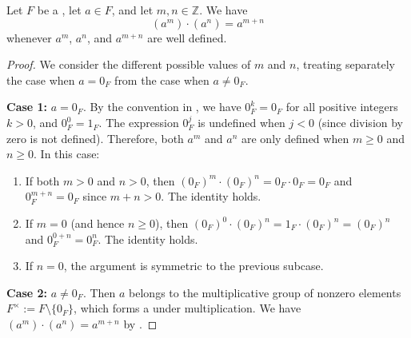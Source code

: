 \begin{lemma} \label{lemma:product_of_powers_of_the_same_base_in_a_field_is_additive_in_exponents}
    Let $F$ be a , let $a \in F$, and let $m,n \in \mathbb{Z}$.  We have
    $$\left(a^m\right)\cdot\left(a^n\right) = a^{m+n}$$
    whenever $a^m$, $a^n$, and $a^{m+n}$ are well defined.
\end{lemma}

\begin{proof}
We consider the different possible values of $m$ and $n$, treating separately the case when $a = 0_F$ from the case when $a \neq 0_F$.

\textbf{Case 1:} $a = 0_F$. By the convention in , we have $0_F^k = 0_F$ for all positive integers $k > 0$, and $0_F^0 = 1_F$. The expression $0_F^j$ is undefined when $j < 0$ (since division by zero is not defined). Therefore, both $a^m$ and $a^n$ are only defined when $m \geq 0$ and $n \geq 0$. In this case:
\begin{enumerate}
    \item If both $m > 0$ and $n > 0$, then $(0_F)^m \cdot (0_F)^n = 0_F \cdot 0_F = 0_F$ and $0_F^{m+n} = 0_F$ since $m+n > 0$. The identity holds.
    \item If $m = 0$ (and hence $n \geq 0$), then $(0_F)^0 \cdot (0_F)^n = 1_F \cdot (0_F)^n = (0_F)^n$ and $0_F^{0+n} = 0_F^n$. The identity holds.
    \item If $n = 0$, the argument is symmetric to the previous subcase.
\end{enumerate}

\textbf{Case 2:} $a \neq 0_F$. Then $a$ belongs to the multiplicative group of nonzero elements $F^\times := F \setminus \{0_F\}$, which forms a  under multiplication. We have $(a^m) \cdot (a^n) = a^{m+n}$ by .




\end{proof}
